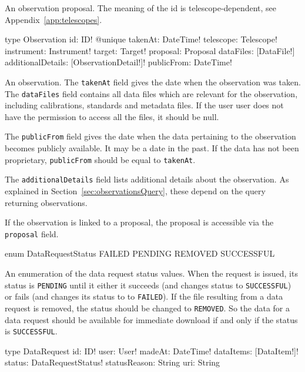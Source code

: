 An observation proposal. The meaning of the id is telescope-dependent, see Appendix~\ref{app:telescopes}.


\begin{code}
type Observation {
  id: ID! @unique
  takenAt: DateTime!
  telescope: Telescope!
  instrument: Instrument!
  target: Target!
  proposal: Proposal
  dataFiles: [DataFile!]
  additionalDetails: [ObservationDetail!]!
  publicFrom: DateTime!
}
\end{code}

An observation. The \verb|takenAt| field gives the date when the observation was taken. The \verb|dataFiles| field contains all data files which are relevant for the observation, including calibrations, standards and metadata files. If the user user does not have the permission to access all the files, it should be null.

The \verb|publicFrom| field gives the date when the data pertaining to the observation becomes publicly available. It may be a date in the past. If the data has not been proprietary, \verb|publicFrom| should be equal to \verb|takenAt|.

The \verb|additionalDetails| field lists additional details about the observation. As explained in Section~\ref{sec:observationsQuery}, these depend on the query returning observations.

If the observation is linked to a proposal, the proposal is accessible via the \verb|proposal| field.

\label{sec:dataRequestType}

\begin{code}
enum DataRequestStatus {
  FAILED
  PENDING
  REMOVED
  SUCCESSFUL
}
\end{code}

An enumeration of the data request status values. When the request is issued, its status is \verb|PENDING| until it either it succeeds (and changes status to \verb|SUCCESSFUL|) or fails (and changes its status to to \verb|FAILED|). If the file resulting from a data request is removed, the status should be changed to \verb|REMOVED|. So the data for a data request should be available for immediate download if and only if the status is \verb|SUCCESSFUL|.


\begin{code}
type DataRequest {
  id: ID!
  user: User!
  madeAt: DateTime!
  dataItems: [DataItem!]!
  status: DataRequestStatus!
  statusReason: String
  uri: String
}
\end{code}

